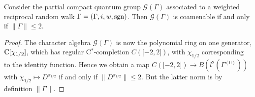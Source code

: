  \begin{Cor} Consider the partial compact quantum group $\mathscr{G}(\Gamma)$ associated to a weighted reciprocal random walk $\Gamma = (\Gamma,i,w,\operatorname{\mathrm{sgn}})$. Then $\mathscr{G}(\Gamma)$ is coamenable if and only if $\|\Gamma\| \leq 2$. 
 \end{Cor}
 \begin{proof}
 The character algebra $\mathscr{G}(\Gamma)$ is now the polynomial ring on one generator, $\mathbb{C}\lbrack \chi_{1/2}\rbrack$, which has regular C$^*$-completion $C(\lbrack -2,2\rbrack)$, with $\chi_{1/2}$ corresponding to the identity function. Hence we obtain a map $C(\lbrack -2,2\rbrack) \rightarrow B(l^2(\Gamma^{(0)}))$ with $\chi_{1/2}\mapsto D^{\pi_{1/2}}$ if and only if $\|D^{\pi_{1/2}}\| \leq  2$.  
    But the latter norm is by definition $\|\Gamma\|$.   
 \end{proof} 